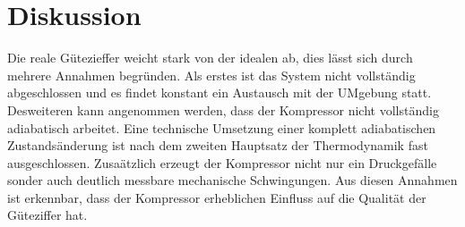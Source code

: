 \section{Diskussion}
\label{sec:Diskussion}
Die reale Gütezieffer weicht stark von der idealen ab, dies lässt sich durch mehrere Annahmen begründen.
Als erstes ist das System nicht vollständig abgeschlossen und es findet konstant ein Austausch mit der UMgebung statt.
Desweiteren kann angenommen werden, dass der Kompressor nicht vollständig adiabatisch arbeitet.
Eine technische Umsetzung einer komplett adiabatischen Zustandsänderung ist nach dem zweiten Hauptsatz der Thermodynamik fast ausgeschlossen.
Zusaätzlich erzeugt der Kompressor nicht nur ein Druckgefälle sonder auch deutlich messbare mechanische Schwingungen.
Aus diesen Annahmen ist erkennbar, dass der Kompressor erheblichen Einfluss auf die Qualität der Güteziffer hat.
